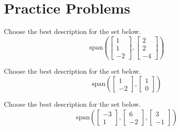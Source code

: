\documentclass{ximera}
\begin{document}
\section*{Practice Problems}

  \begin{problem}\label{prob:describespan1}
  Choose the best description for the set below.
  $$\mbox{span}\left(\begin{bmatrix}1\\1\\-2\end{bmatrix}, \begin{bmatrix}2\\2\\-4\end{bmatrix}\right)$$
  
  \begin{multipleChoice}
 \end{multipleChoice}
  \end{problem}
  
  \begin{problem}\label{prob:describespan2}
  Choose the best description for the set below.
  $$\mbox{span}\left(\begin{bmatrix}1\\-2\end{bmatrix}, \begin{bmatrix}1\\0\end{bmatrix}\right)$$
  
   \begin{multipleChoice}
  \end{multipleChoice}
  \end{problem}
  
  \begin{problem}\label{prob:describespan3}
  Choose the best description for the set below.
  $$\mbox{span}\left(\begin{bmatrix}-3\\1\end{bmatrix}, \begin{bmatrix}6\\-2\end{bmatrix}, \begin{bmatrix}3\\-1\end{bmatrix}\right)$$
  
  \begin{multipleChoice}
\end{multipleChoice}
  \end{problem}
\end{document}
